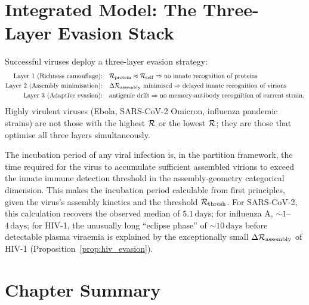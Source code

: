 \section{Integrated Model: The Three-Layer Evasion Stack}
\label{sec:evasion_stack}

\begin{definition}
\label{def:evasion_stack}
Successful viruses deploy a three-layer evasion strategy:
\begin{align}
  \text{Layer 1 (Richness camouflage):} &\quad \mathcal{R}_{\mathrm{protein}} \approx \mathcal{R}_{\mathrm{self}}
     \Rightarrow \text{no innate recognition of proteins} \notag \\
  \text{Layer 2 (Assembly minimisation):} &\quad \Delta\mathcal{R}_{\mathrm{assembly}} \text{ minimised}
     \Rightarrow \text{delayed innate recognition of virions} \notag \\
  \text{Layer 3 (Adaptive evasion):} &\quad \text{antigenic drift}
     \Rightarrow \text{no memory-antibody recognition of current strain.} \notag
\end{align}
Highly virulent viruses (Ebola, SARS-CoV-2 Omicron, influenza pandemic strains)
are not those with the highest $\mathcal{R}$ or the lowest $\mathcal{R}$; they are those
that optimise all three layers simultaneously.
\end{definition}

\begin{remark}
The incubation period of any viral infection is, in the partition framework,
the time required for the virus to accumulate sufficient assembled virions
to exceed the innate immune detection threshold in the assembly-geometry
categorical dimension. This makes the incubation period calculable from
first principles, given the virus's assembly kinetics and the threshold
$\mathcal{R}_{\mathrm{thresh}}$. For SARS-CoV-2, this calculation recovers the
observed median of $5.1\,\mathrm{days}$; for influenza A, $\sim 1$--$4\,\mathrm{days}$;
for HIV-1, the unusually long ``eclipse phase'' of $\sim 10\,\mathrm{days}$
before detectable plasma viraemia is explained by the exceptionally small
$\Delta\mathcal{R}_{\mathrm{assembly}}$ of HIV-1 (Proposition~\ref{prop:hiv_evasion}).
\end{remark}

\section*{Chapter Summary}
\label{sec:ch24_summary}

